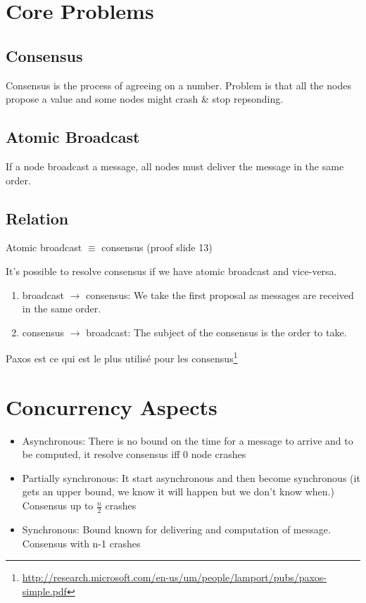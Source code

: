 \section{Core Problems}
\subsection{Consensus}
Consensus is the process of agreeing on a number.
Problem is that all the nodes propose a value and some nodes might
crash \& stop repsonding.

\subsection{Atomic Broadcast}
If a node broadcast a message, all nodes must deliver
the message in the same order.

\subsection{Relation}
Atomic broadcast $\equiv$ consensus (proof slide 13)

It's possible to resolve consensus if we have atomic broadcast and vice-versa.
\begin{enumerate}
    \item broadcast $\to$ consensus: We take the first proposal as
    messages are received in the same order.
    \item consensus $\to$ broadcast: The subject of the consensus is the order to take.
\end{enumerate}

Paxos est ce qui est le plus utilisé pour les consensus\footnote{\url{http://research.microsoft.com/en-us/um/people/lamport/pubs/paxos-simple.pdf}}

\section{Concurrency Aspects}

\begin{itemize}
    \item Asynchronous: There is no bound on the time for a message to
     arrive and to be computed, it resolve consensus iff 0 node crashes
    \item Partially synchronous: It start asynchronous and then become
        synchronous (it gets an upper bound, we know it will happen but we
        don't know when.)
	  Consensus up to $\frac{n}{2}$ crashes
    \item Synchronous: Bound known for delivering and computation of message. Consensus with n-1 crashes
\end{itemize}

